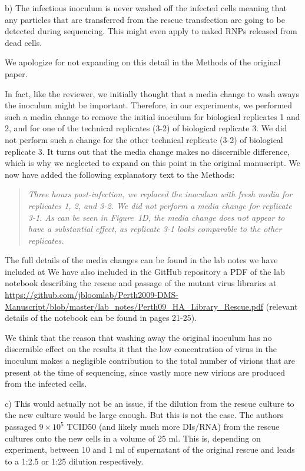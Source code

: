 \documentclass[11pt, oneside]{article}   	%
\newcommand{\response}[1]{{\color{black}#1}}
\begin{document}
b) The infectious inoculum is never washed off the infected cells meaning that any particles that are transferred from the rescue transfection are going to be detected during sequencing. This might even apply to naked RNPs released from dead cells. 

\response{
We apologize for not expanding on this detail in the Methods of the original paper.

In fact, like the reviewer, we initially thought that a media change to wash aways the inoculum might be important. 
Therefore, in our experiments, we performed such a media change to remove the initial inoculum for biological replicates 1 and 2, and for one of the technical replicates (3-2) of biological replicate 3.
We did not perform such a change for the other technical replicate (3-2) of biological replicate 3.
It turns out that the media change makes no discernible difference, which is why we neglected to expand on this point in the original manuscript. 
We now have added the following explanatory text to the Methods:

\begin{quote}
\textsl{Three hours post-infection, we replaced the inoculum with fresh media for replicates 1, 2, and 3-2.
We did not perform a media change for replicate 3-1.
As can be seen in Figure~1D, the media change does not appear to have a substantial effect, as replicate 3-1 looks comparable to the other replicates.
}
\end{quote}
The full details of the media changes can be found in the lab notes we have included at We have also included in the GitHub repository a PDF of the lab notebook describing the rescue and passage of the mutant virus libraries at \url{https://github.com/jbloomlab/Perth2009-DMS-Manuscript/blob/master/lab_notes/Perth09_HA_Library_Rescue.pdf} (relevant details of the notebook can be found in pages 21-25).

We think that the reason that washing away the original inoculum has no discernible effect on the results it that the low concentration of virus in the inoculum makes a negligible contribution to the total number of virions that are present at the time of sequencing, since vastly more new virions are produced from the infected cells.
}

c) This would actually not be an issue, if the dilution from the rescue culture to the new culture would be large enough. But this is not the case. The authors passaged $9\times10^5$ TCID50 (and likely much more DIs/RNA) from the rescue cultures onto the new cells in a volume of 25 ml. This is, depending on experiment, between 10 and 1 ml of supernatant of the original rescue and leads to a 1:2.5 or 1:25 dilution respectively. 
\end{document}
